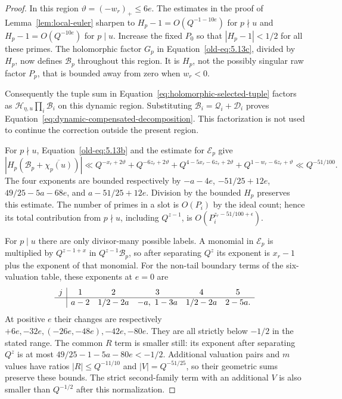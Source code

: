 \documentclass[12pt]{article}
\begin{document}
\begin{proof}
In this region $\vartheta=(-w_r)_+\le6e$.  The estimates in the
proof of Lemma~\ref{lem:local-euler} sharpen to
$H_p-1=O(Q^{-1-10e})$ for $p\nmid u$ and
$H_p-1=O(Q^{-10e})$ for $p\mid u$.  Increase the fixed $P_0$ so
that $|H_p-1|<1/2$ for all these primes.  The holomorphic
factor $G_p$ in Equation~\eqref{old-eq:5.13c}, divided by $H_p$,
now defines $\mathcal B_p$ throughout this region.  It is $H_p$,
not the possibly singular raw factor $P_p$, that is bounded away
from zero when $w_r<0$.

Consequently the tuple sum in Equation~\eqref{eq:holomorphic-selected-tuple}
factors as $\mathcal H_{\eta,u}\prod_i\mathcal B_i$ on this dynamic
region.  Substituting $\mathcal B_i=\mathcal Q_i+\mathcal D_i$ proves
Equation~\eqref{eq:dynamic-compensated-decomposition}.  This factorization
is not used to continue the correction outside the present region.

For $p\nmid u$, Equation~\eqref{old-eq:5.13b} and the estimate for
$\mathcal E_p$ give
\[
 |H_p(\mathcal B_p+\overline{\chi_p(u)})|
 \ll Q^{-x_r+2\vartheta}+Q^{-6z_r+2\vartheta}
       +Q^{4-5x_r-6z_r+2\vartheta}
       +Q^{1-w_r-6z_r+\vartheta}
 \ll Q^{-51/100}.
\]
The four exponents are bounded respectively by
$-a-4e$, $-51/25+12e$, $49/25-5a-68e$, and
$a-51/25+12e$.  Division by the bounded $H_p$ preserves this
estimate.  The number of primes in a slot is $O(P_i)$ by the ideal
count; hence its total contribution from $p\nmid u$, including
$Q^{z-1}$, is $O(P_i^{z_r-51/100+\epsilon})$.

For $p\mid u$ there are only divisor-many possible labels.  A
monomial in $\mathcal E_p$ is multiplied by $Q^{z-1+x}$ in
$Q^{z-1}\mathcal B_p$, so after separating $Q^z$ its exponent is
$x_r-1$ plus the exponent of that monomial.  For the non-tail
boundary terms of the six-valuation table, these exponents at
$e=0$ are
\[
\begin{array}{c|ccccc}
 j&1&2&3&4&5\\\hline
 &a-2&1/2-2a&-a,\ 1-3a&1/2-2a&2-5a.
\end{array}
\]
At positive $e$ their changes are respectively
$+6e,-32e,(-26e,-48e),-42e,-80e$.  They are all strictly below
$-1/2$ in the stated range.  The common $R$ term is smaller still:
its exponent after separating $Q^z$ is at most $49/25-1-5a-80e<-1/2$.
Additional valuation pairs and $m$ values have ratios
$|R|\le Q^{-11/10}$ and $|V|=Q^{-51/25}$, so their geometric sums
preserve these bounds.  The strict second-family term with an
additional $V$ is also smaller than $Q^{-1/2}$ after this
normalization.


\end{proof}
\end{document}
